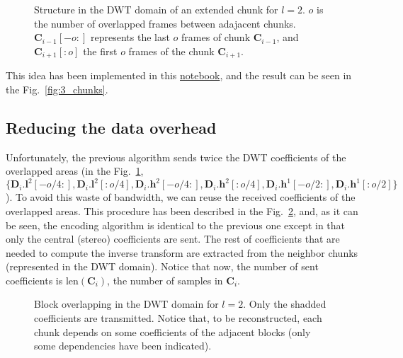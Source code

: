 
\begin{figure}
  \centering
  \caption{Structure in the DWT domain of an extended chunk for
    $l=2$. $o$ is the number of overlapped frames between adajacent
    chunks. ${\mathbf C}_{i-1}[-o:]$ represents the last $o$ frames of
    chunk ${\mathbf C}_{i-1}$, and ${\mathbf C}_{i+1}[:o]$ the first
    $o$ frames of the chunk ${\mathbf C}_{i+1}$.}
  \label{fig:subbands}
\end{figure}

This idea has been implemented in this
\href{https://github.com/Tecnologias-multimedia/intercom/blob/master/docs/overlapped_DWT_I.ipynb}{notebook},
and the result can be seen in the Fig.~\ref{fig:3_chunks}.


\subsection{Reducing the data overhead}

\label{sec:reducing}

Unfortunately, the previous algorithm sends twice the DWT coefficients
of the overlapped areas (in the Fig.~\ref{fig:subbands}, $\{{\mathbf
  D}_i.{\mathbf l}^2[-o/4:], {\mathbf D}_i.{\mathbf l}^2[:o/4],
{\mathbf D}_i.{\mathbf h}^2[-o/4:], {\mathbf D}_i.{\mathbf
  h}^2[:o/4], {\mathbf D}_i.{\mathbf h}^1[-o/2:], {\mathbf
  D}_i.{\mathbf h}^1[:o/2]\}$). To avoid this waste of bandwidth, we
can reuse the received coefficients of the overlapped areas. This
procedure has been described in the Fig.~\ref{fig:overlapping}, and,
as it can be seen, the encoding algorithm is identical to the previous
one except in that only the central (stereo) coefficients are
sent. The rest of coefficients that are needed to compute the inverse
transform are extracted from the neighbor chunks (represented in the
DWT domain). Notice that now, the number of sent coefficients is
$\text{len}({\mathbf C}_i)$, the number of samples in ${\mathbf C}_i$.

\begin{figure}
  \centering
  \caption{Block overlapping in the DWT domain for $l=2$. Only the
    shadded coefficients are transmitted. Notice that, to be
    reconstructed, each chunk depends on some coefficients of the
    adjacent blocks (only some dependencies have been indicated).}
  \label{fig:overlapping}
\end{figure}

